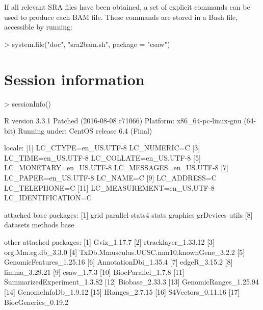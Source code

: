 \documentclass[12pt]{report}
\renewenvironment{Schunk}{\vspace{0pt}}{\vspace{0pt}}
\begin{document}
If all relevant SRA files have been obtained, a set of explicit commands can be used to produce each BAM file.
These commands are stored in a Bash file, accessible by running:

\begin{Schunk}
\begin{Sinput}
> system.file("doc", "sra2bam.sh", package = "csaw")
\end{Sinput}
\end{Schunk}

\section{Session information}
\begin{Schunk}
\begin{Sinput}
> sessionInfo()
\end{Sinput}
\begin{Soutput}
R version 3.3.1 Patched (2016-08-08 r71066)
Platform: x86_64-pc-linux-gnu (64-bit)
Running under: CentOS release 6.4 (Final)

locale:
 [1] LC_CTYPE=en_US.UTF-8       LC_NUMERIC=C              
 [3] LC_TIME=en_US.UTF-8        LC_COLLATE=en_US.UTF-8    
 [5] LC_MONETARY=en_US.UTF-8    LC_MESSAGES=en_US.UTF-8   
 [7] LC_PAPER=en_US.UTF-8       LC_NAME=C                 
 [9] LC_ADDRESS=C               LC_TELEPHONE=C            
[11] LC_MEASUREMENT=en_US.UTF-8 LC_IDENTIFICATION=C       

attached base packages:
 [1] grid      parallel  stats4    stats     graphics  grDevices utils    
 [8] datasets  methods   base     

other attached packages:
 [1] Gviz_1.17.7                             
 [2] rtracklayer_1.33.12                     
 [3] org.Mm.eg.db_3.3.0                      
 [4] TxDb.Mmusculus.UCSC.mm10.knownGene_3.2.2
 [5] GenomicFeatures_1.25.16                 
 [6] AnnotationDbi_1.35.4                    
 [7] edgeR_3.15.2                            
 [8] limma_3.29.21                           
 [9] csaw_1.7.3                              
[10] BiocParallel_1.7.8                      
[11] SummarizedExperiment_1.3.82             
[12] Biobase_2.33.3                          
[13] GenomicRanges_1.25.94                   
[14] GenomeInfoDb_1.9.12                     
[15] IRanges_2.7.15                          
[16] S4Vectors_0.11.16                       
[17] BiocGenerics_0.19.2                     


\end{Soutput}
\end{Schunk}
\end{document}
